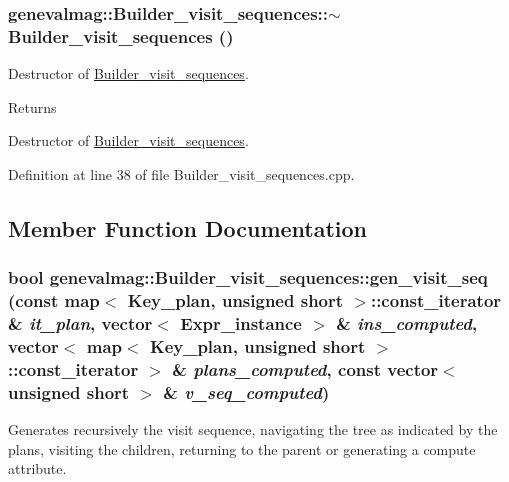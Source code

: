 \hypertarget{classgenevalmag_1_1Builder__visit__sequences_a9b86db069a7c5564cf802bef80599a7d}{
\subsubsection[{$\sim$Builder\_\-visit\_\-sequences}]{\setlength{\rightskip}{0pt plus 5cm}genevalmag::Builder\_\-visit\_\-sequences::$\sim$Builder\_\-visit\_\-sequences ()}}
\label{classgenevalmag_1_1Builder__visit__sequences_a9b86db069a7c5564cf802bef80599a7d}
Destructor of \hyperlink{classgenevalmag_1_1Builder__visit__sequences}{Builder\_\-visit\_\-sequences}. \begin{DoxyReturn}{Returns}

\end{DoxyReturn}
Destructor of \hyperlink{classgenevalmag_1_1Builder__visit__sequences}{Builder\_\-visit\_\-sequences}. 

Definition at line 38 of file Builder\_\-visit\_\-sequences.cpp.



\subsection{Member Function Documentation}
\hypertarget{classgenevalmag_1_1Builder__visit__sequences_a81498899f7859f929abb96526f20e4a3}{
\subsubsection[{gen\_\-visit\_\-seq}]{\setlength{\rightskip}{0pt plus 5cm}bool genevalmag::Builder\_\-visit\_\-sequences::gen\_\-visit\_\-seq (const map$<$ {\bf Key\_\-plan}, unsigned short $>$::const\_\-iterator \& {\em it\_\-plan}, \/  vector$<$ {\bf Expr\_\-instance} $>$ \& {\em ins\_\-computed}, \/  vector$<$ map$<$ {\bf Key\_\-plan}, unsigned short $>$::const\_\-iterator $>$ \& {\em plans\_\-computed}, \/  const vector$<$ unsigned short $>$ \& {\em v\_\-seq\_\-computed})}}
\label{classgenevalmag_1_1Builder__visit__sequences_a81498899f7859f929abb96526f20e4a3}
Generates recursively the visit sequence, navigating the tree as indicated by the plans, visiting the children, returning to the parent or generating a compute attribute.


